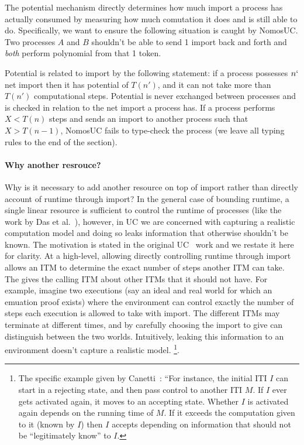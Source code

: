 The potential mechanism directly determines how much import a process has actually consumed by measuring how much comutation it does and is still able to do.
Specifically, we want to ensure the following situation is caught by NomosUC.
Two processes $A$ and $B$ shouldn't be able to send 1 import back and forth and \emph{both} perform polynomial from that 1 token.

Potential is related to import by the following statement: if a process
possesses $n`$ net import then it has potential of $T(n')$, and it can not take more than $T(n')$ computational steps.
Potential is never exchanged between processes and is checked in relation to the net import a process has. If a process performs 
$X < T(n)$ steps and sends an import to another process such that $X > T(n-1)$, NomosUC fails to type-check the process (we leave all typing rules to the end of the section).

\paragraph{Why another resrouce?} 
Why is it necessary to add another resource on top of import rather than directly account of runtime through import?
In the general case of bounding runtime, a single linear resource is sufficient to control the runtime of processes (like the work by Das et al.~\cite{rast}), however, in UC we are concerned with capturing a realistic computation model and doing so leaks information that otherwise shouldn't be known. 
The motivation is stated in the original UC~\cite{uc} work and we restate it here for clarity.
At a high-level, allowing directly controlling runtime through import allows an ITM to determine the exact number of steps another ITM can take.
The gives the calling ITM about other ITMs that it should not have. 
For example, imagine two executions (say an ideal and real world for which an emuation proof exists) where the environment can control exactly the number of steps each execution is allowed to take with import. 
The different ITMs may terminate at different times, and by carefully choosing the import to give \Z can distinguish between the two worlds.
Intuitively, leaking this information to an environment doesn't capture a realistic model.
\footnote{The specific example given by Canetti~\cite{UC}: ``For instance, the initial ITI $I$ can start in a rejecting state, and then pass control to another ITI $M$. If $I$ ever gets activated again, it moves to an accepting state. Whether $I$ is activated again depends on the running time of $M$. If it exceeds the computation given to it (known by $I$) then $I$ accepts depending on information that should not be ``legitimately know'' to $I$.}.

